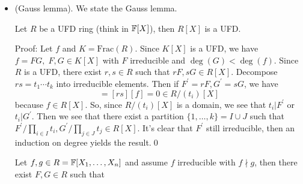 \begin{itemize}
\begin{example}
    Now, since $\det$ is an irreducible homogeneous polynomial, the difference $\det-1$ must be irreducible. Therefore
    $I(SL_n\bbF) = (\det - 1)$ and we can compute the tangent space $T_I(SL_n)=V(d_I(\det))$. 
    We have 
    \begin{equation}
        \begin{split}
            d_I\det &= \sum_{k,\ell} D_{k\ell}(\det)(I)X_{k\ell}\\
                &= \sum_{k,\ell}\sum_{\sigma\in S_n}D_{k\ell}\prod_{i=1}^nX_{i\sigma(i)}(I) X_{k\ell}\\
                &= \sum_{k,\ell}\sum_{\sigma\in S_n}\delta_{\ell,\sigma(k)}
                \prod_{i\neq k}\delta_{i,\sigma(i)} X_{k\ell}\\
                &= \sum_{k,\ell}\delta_{k\ell} X_{k\ell}\quad
                (\delta_{\ell,\sigma(k)}
                \prod_{i\neq k}\delta_{i,\sigma(i)}\neq0\;\text{only if }\sigma=1)\\
                &=\sum_k X_{kk}.
        \end{split}
    \end{equation}
    Therefore $T_ISL_n(\bbF) = \fr{sl}_n\bbF$, the Lie algebra of traceless matrices.
  \end{example}
  \item(Gauss lemma).
  We state the Gauss lemma.
  \begin{lemma}
    Let $R$ be a UFD ring (think in $\mathbb{F}[X]$), then $R[X]$ is a UFD.
  \end{lemma} 
  Proof: Let $f$ and $K=\text{Frac}(R)$. Since $K[X]$ is a UFD, we have 
  $f = FG,\;F,G\in K[X]$ with $F$ irreducible and $\deg(G)<\deg(f)$. Since $R$ is a UFD, there exist 
  $r,s\in R$ such that $rF,sG\in R[X]$. Decompose $rs = t_1\cdots t_k$ into irreducible elements. 
  Then if $F^\prime=rF, G^\prime=sG$, we have 
  \begin{equation}
    [F^\prime][G^\prime] = [rs][f] = 0 \in R/(t_i)[X]
  \end{equation}
  because $f\in R[X]$. So, since $R/(t_i)[X]$ is a domain, we see that $t_i|F^\prime$ or $t_i|G^\prime$. Then we see that 
  there exist a partition $\{1,\dots, k\}=I\cup J$ such that $F^\prime/\prod_{i\in I}t_i, G^\prime/\prod_{j\in J}t_j\in R[X]$.
  It's clear that $F^\prime$ still irreducible, then an induction on degree yields the result.\qed
  \begin{corollary}\label{corollary: generalized gcd}
    Let $f,g\in R=\mathbb{F}[X_1,\dots, X_n]$ and assume $f$ irreducible with $f\nmid g$, then there exist $F,G\in R$ such that 

\end{corollary}
\end{itemize}
